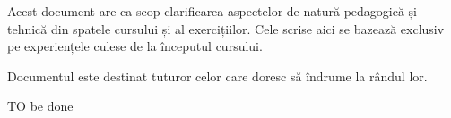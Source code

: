 
\begin{chapsummary}
Acest document are ca scop clarificarea aspectelor de natură pedagogică și
tehnică din spatele cursului și al exercițiilor. Cele scrise aici se bazează
exclusiv pe experiențele culese de la începutul cursului.

Documentul este destinat tuturor celor care doresc să îndrume la rândul lor.
\end{chapsummary}

TO be done

